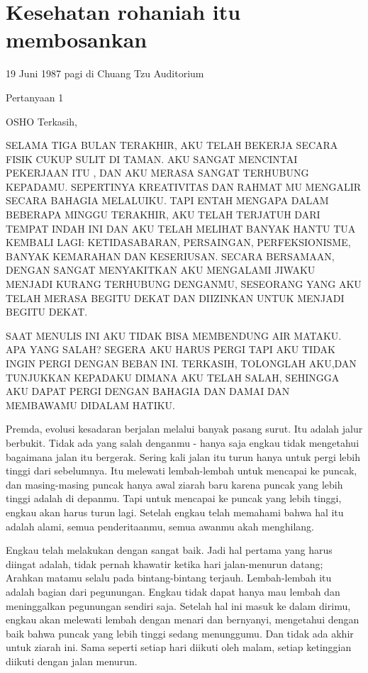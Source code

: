 \chapter{Kesehatan rohaniah itu membosankan}
19 Juni 1987 pagi di Chuang Tzu Auditorium

Pertanyaan 1

OSHO Terkasih,

SELAMA TIGA BULAN TERAKHIR, AKU TELAH BEKERJA SECARA FISIK CUKUP SULIT DI TAMAN.
AKU SANGAT MENCINTAI PEKERJAAN ITU , DAN AKU MERASA SANGAT TERHUBUNG KEPADAMU.
SEPERTINYA KREATIVITAS DAN RAHMAT MU MENGALIR SECARA BAHAGIA MELALUIKU.
TAPI ENTAH MENGAPA DALAM BEBERAPA MINGGU TERAKHIR,
AKU TELAH TERJATUH DARI TEMPAT INDAH INI DAN AKU TELAH MELIHAT BANYAK HANTU TUA KEMBALI LAGI:
KETIDASABARAN, PERSAINGAN, PERFEKSIONISME, BANYAK KEMARAHAN DAN KESERIUSAN.
SECARA BERSAMAAN, DENGAN SANGAT MENYAKITKAN AKU MENGALAMI JIWAKU MENJADI KURANG TERHUBUNG DENGANMU,
SESEORANG YANG AKU TELAH MERASA BEGITU DEKAT DAN DIIZINKAN UNTUK MENJADI BEGITU DEKAT.

SAAT MENULIS INI AKU TIDAK BISA MEMBENDUNG AIR MATAKU.
APA YANG SALAH? SEGERA AKU HARUS PERGI TAPI AKU TIDAK INGIN PERGI DENGAN BEBAN INI.
TERKASIH, TOLONGLAH AKU,DAN TUNJUKKAN KEPADAKU DIMANA AKU TELAH SALAH,
SEHINGGA AKU DAPAT PERGI DENGAN BAHAGIA DAN DAMAI DAN MEMBAWAMU DIDALAM HATIKU.

Premda, evolusi kesadaran berjalan melalui banyak pasang surut. Itu adalah jalur berbukit. Tidak ada yang salah denganmu -
hanya saja engkau tidak mengetahui bagaimana jalan itu bergerak.
Sering kali jalan itu turun hanya untuk pergi lebih tinggi dari sebelumnya.
Itu melewati lembah-lembah untuk mencapai ke puncak, dan masing-masing puncak hanya awal ziarah baru
karena puncak yang lebih tinggi adalah di depanmu. Tapi untuk mencapai ke puncak yang lebih tinggi, engkau akan harus turun lagi.
Setelah engkau telah memahami bahwa hal itu adalah alami, semua penderitaanmu, semua awanmu akah menghilang.

Engkau telah melakukan dengan sangat baik. Jadi hal pertama yang harus diingat adalah, tidak pernah khawatir ketika hari jalan-menurun datang;
Arahkan matamu selalu pada bintang-bintang terjauh. Lembah-lembah itu adalah bagian dari pegunungan. Engkau tidak dapat hanya mau lembah
dan meninggalkan pegunungan sendiri saja.
Setelah hal ini masuk ke dalam dirimu, engkau akan melewati lembah dengan menari dan bernyanyi,
mengetahui dengan baik bahwa puncak yang lebih tinggi sedang menunggumu.
Dan tidak ada akhir untuk ziarah ini. Sama seperti setiap hari diikuti oleh malam, setiap ketinggian diikuti dengan jalan menurun.

